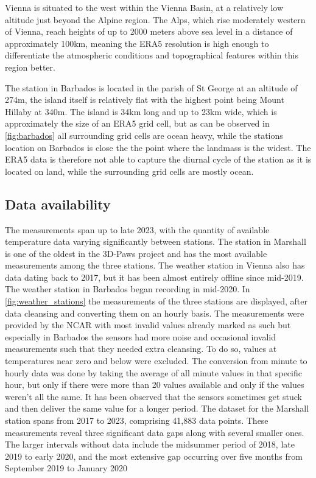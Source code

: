 Vienna is situated to the west within the Vienna Basin, at a relatively low altitude just beyond the Alpine region. The Alps, which rise moderately western of Vienna, reach heights of up to 2000 meters above sea level in a distance of approximately 100km, meaning the ERA5 resolution is high enough to differentiate the atmospheric conditions and topographical features within this region better.

The station in Barbados is located in the parish of St George at an altitude of 274m, the island itself is relatively flat with the highest point being Mount Hillaby at 340m. The island is 34km long and up to 23km wide, which is approximately the size of an ERA5 grid cell, but as can be observed in \autoref{fig:barbados} all surrounding grid cells are ocean heavy, while the stations location on Barbados is close the the point where the landmass is the widest. The ERA5 data is therefore not able to capture the diurnal cycle of the station as it is located on land, while the surrounding grid cells are mostly ocean.

\subsection{Data availability}
The measurements span up to late 2023, with the quantity of available temperature data varying significantly between stations. The station in Marshall is one of the oldest in the 3D-Paws project and has the most available measurements among the three stations. The weather station in Vienna also has data dating back to 2017, but it has been almost entirely offline since mid-2019.
The weather station in Barbados began recording in mid-2020.
In \autoref{fig:weather_stations} the measurements of the three stations are displayed, after data cleansing and converting them on an hourly basis. The measurements were provided by the NCAR with most invalid values already marked as such but especially in Barbados the sensors had more noise and occasional invalid measurements such that they needed extra cleansing. To do so, values at temperatures near zero and below were excluded. The conversion from minute to hourly data was done by taking the average of all minute values in that specific hour, but only if there were more than 20 values available and only if the values weren't all the same. It has been observed that the sensors sometimes get stuck and then deliver the same value for a longer period. The dataset for the Marshall station spans from 2017 to 2023, comprising 41,883 data points. These measurements reveal three significant data gaps along with several smaller ones. The larger intervals without data include the midsummer period of 2018, late 2019 to early 2020, and the most extensive gap occurring over five months from September 2019 to January 2020

